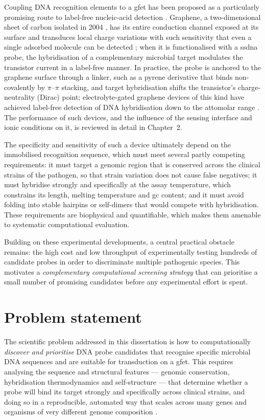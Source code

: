 Coupling DNA recognition elements to a \acrfull{gfet} has been proposed as a particularly promising route
to label-free nucleic-acid detection \citep{green2015}. Graphene, a two-dimensional sheet of carbon
isolated in 2004 \citep{novoselov2004}, has its entire conduction channel exposed at its surface and
transduces local charge variations with such sensitivity that even a single adsorbed molecule can be
detected \citep{schedin2007}; when it is functionalised with a \acrfull{ssdna} probe, the hybridisation of
a complementary microbial target modulates the transistor current in a label-free manner. In practice, the
probe is anchored to the graphene surface through a linker, such as a pyrene derivative that binds
non-covalently by $\pi$--$\pi$ stacking, and target hybridisation shifts the transistor's charge-neutrality
(Dirac) point; electrolyte-gated graphene devices of this kind have achieved label-free detection of DNA
hybridisation down to the attomolar range \citep{campos2019}. The performance of such devices, and the
influence of the sensing interface and ionic conditions on it, is reviewed in detail in Chapter~2.

The specificity and sensitivity of such a device ultimately depend on the immobilised recognition
sequence, which must meet several partly competing requirements: it must target a genomic region that is
conserved across the clinical strains of the pathogen, so that strain variation does not cause false
negatives; it must hybridise strongly and specifically at the assay temperature, which constrains its
length, melting temperature and \acrshort{gc} content; and it must avoid folding into stable hairpins or
self-dimers that would compete with hybridisation. These requirements are biophysical and quantifiable,
which makes them amenable to systematic computational evaluation.

Building on these experimental developments, a central practical obstacle remains: the high cost and low
throughput of experimentally testing hundreds of candidate probes in order to discriminate multiple
pathogenic species. This motivates a \emph{complementary computational screening strategy} that can
prioritise a small number of promising candidates before any experimental effort is spent.

\section{Problem statement}

The scientific problem addressed in this dissertation is how to computationally \emph{discover and
prioritise} DNA probe candidates that recognise specific microbial DNA sequences and are suitable for
transduction on a \acrshort{gfet}. This requires analysing the sequence and structural features --- genomic
conservation, hybridisation thermodynamics and self-structure --- that determine whether a probe will bind
its target strongly and specifically across clinical strains, and doing so in a reproducible, automated way
that scales across many genes and organisms of very different genome composition
\citep{green2015,campos2019}.

